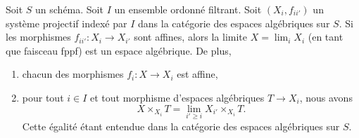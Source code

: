 \begin{lemma}
\label{lemma-directed-inverse-system-has-limit}
Soit $S$ un schéma. Soit $I$ un ensemble ordonné filtrant.
Soit $(X_i, f_{ii'})$ un système projectif indexé par $I$
dans la catégorie des espaces algébriques sur $S$.
Si les morphismes $f_{ii'} : X_i \to X_{i'}$ sont affines, alors la
limite $X = \lim_i X_i$ (en tant que faisceau fppf) est un espace algébrique.
De plus,
\begin{enumerate}
\item chacun des morphismes $f_i : X \to X_i$ est affine,
\item pour tout $i \in I$ et tout morphisme d'espaces algébriques
$T \to X_i$, nous avons
$$
X \times_{X_i} T = \lim_{i' \geq i} X_{i'} \times_{X_i} T.
$$
Cette égalité étant entendue dans la catégorie des espaces algébriques sur $S$.
\end{enumerate}
\end{lemma}


